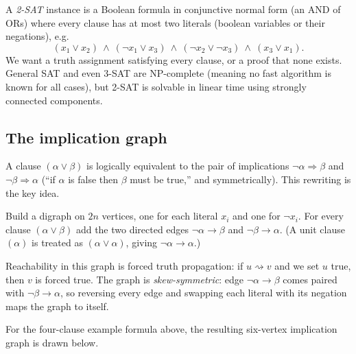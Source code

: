 A \emph{2-SAT} instance is a Boolean formula in conjunctive normal form (an AND of ORs) where every clause has at most two literals (boolean variables or their negations), e.g.
\[
(x_1\lor x_2)\ \land\ (\lnot x_1\lor x_3)\ \land\ (\lnot x_2\lor\lnot x_3)\ \land\ (x_3 \lor x_1).
\]
We want a truth assignment satisfying every clause, or a proof that none exists. General SAT and even 3-SAT are NP-complete (meaning no fast algorithm is known for all cases), but 2-SAT is solvable in linear time using strongly connected components.

\subsection{The implication graph}

A clause $(\alpha\lor\beta)$ is logically equivalent to the pair of implications $\lnot\alpha\Rightarrow\beta$ and $\lnot\beta\Rightarrow\alpha$ (``if $\alpha$ is false then $\beta$ must be true,'' and symmetrically). This rewriting is the key idea.

\begin{definition}
\label{ch05:def-implgraph}
Build a digraph on $2n$ vertices, one for each literal $x_i$ and one for $\lnot x_i$. For every clause $(\alpha\lor\beta)$ add the two directed edges $\lnot\alpha\to\beta$ and $\lnot\beta\to\alpha$. (A unit clause $(\alpha)$ is treated as $(\alpha\lor\alpha)$, giving $\lnot\alpha\to\alpha$.)
\end{definition}

Reachability in this graph is forced truth propagation: if $u\rightsquigarrow v$ and we set $u$ true, then $v$ is forced true. The graph is \emph{skew-symmetric}: edge $\lnot\alpha\to\beta$ comes paired with $\lnot\beta\to\alpha$, so reversing every edge and swapping each literal with its negation maps the graph to itself.

For the four-clause example formula above, the resulting six-vertex implication graph is drawn below.

\begin{center}
\end{center}

